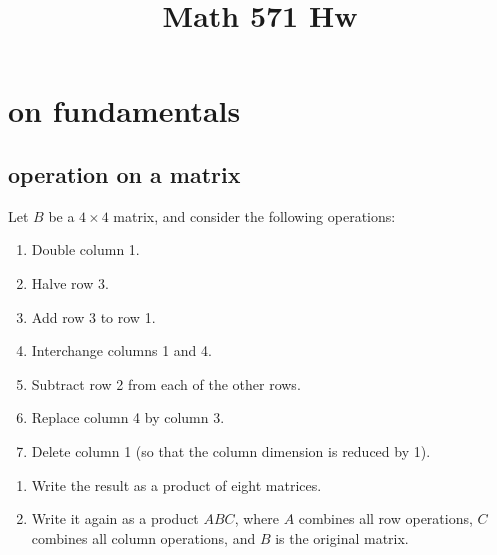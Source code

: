 \documentclass[lang=cn,11pt]{elegantbook}
\title{Math 571 Hw}
\begin{document}
\frontmatter
\tableofcontents
\mainmatter




\chapter{on fundamentals}
\section{operation on a matrix}

Let \( B \) be a \( 4 \times 4 \) matrix, and consider the following operations:
\begin{enumerate}
    \item Double column 1.
    \item Halve row 3.
    \item Add row 3 to row 1.
    \item Interchange columns 1 and 4.
    \item Subtract row 2 from each of the other rows.
    \item Replace column 4 by column 3.
    \item Delete column 1 (so that the column dimension is reduced by 1).
\end{enumerate}
\begin{enumerate}
    \item[(a)] Write the result as a product of eight matrices.
    \item[(b)] Write it again as a product \( ABC \), where \( A \) combines all row operations, \( C \) combines all column operations, and \( B \) is the original matrix.
\end{enumerate}
\end{document}
